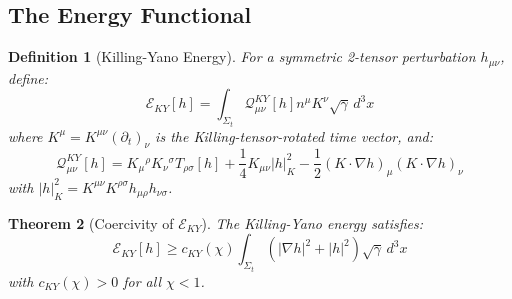 \documentclass[12pt,a4paper]{article}
\newtheorem{theorem}{Theorem}[section]
\newtheorem{definition}[theorem]{Definition}
\begin{document}
\subsection{The Energy Functional}

\begin{definition}[Killing-Yano Energy]\label{def:KY-energy}
For a symmetric 2-tensor perturbation $h_{\mu\nu}$, define:
\begin{equation}
\mathcal{E}_{KY}[h] = \int_{\Sigma_t} \mathcal{Q}^{KY}_{\mu\nu}[h] n^\mu K^\nu \sqrt{\gamma}\, d^3x
\end{equation}
where $K^\mu = K^{\mu\nu}(\partial_t)_\nu$ is the Killing-tensor-rotated time vector, and:
\begin{equation}
\mathcal{Q}^{KY}_{\mu\nu}[h] = K_\mu{}^\rho K_\nu{}^\sigma T_{\rho\sigma}[h] + \frac{1}{4}K_{\mu\nu}|h|^2_{K} - \frac{1}{2}(K \cdot \nabla h)_\mu (K \cdot \nabla h)_\nu
\end{equation}
with $|h|^2_K = K^{\mu\nu}K^{\rho\sigma}h_{\mu\rho}h_{\nu\sigma}$.
\end{definition}

\begin{theorem}[Coercivity of $\mathcal{E}_{KY}$]\label{thm:KY-coercive}
The Killing-Yano energy satisfies:
\begin{equation}
\mathcal{E}_{KY}[h] \geq c_{KY}(\chi) \int_{\Sigma_t} (|\nabla h|^2 + |h|^2) \sqrt{\gamma}\, d^3x
\end{equation}
with $c_{KY}(\chi) > 0$ for all $\chi < 1$.
\end{theorem}
\end{document}

